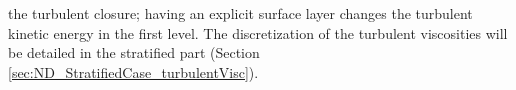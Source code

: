 the turbulent closure; having an explicit surface layer changes
the turbulent kinetic energy in the first level. The discretization
of the turbulent viscosities will be detailed in the stratified part
(Section \ref{sec:ND_StratifiedCase_turbulentVisc}).

